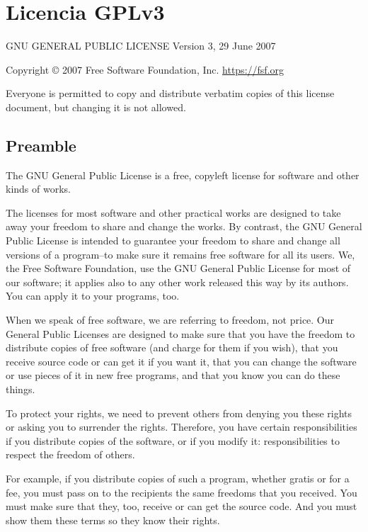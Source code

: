 \chapter{Licencia GPLv3}
\label{apn:gnu-gpl-lic}

\begin{center}
GNU GENERAL PUBLIC LICENSE
Version 3, 29 June 2007

Copyright © 2007 Free Software Foundation, Inc. \url{https://fsf.org}

Everyone is permitted to copy and distribute verbatim copies of this license document, but changing it is not allowed.
\end{center}


\section*{Preamble}

The GNU General Public License is a free, copyleft license for software and other kinds of works.

The licenses for most software and other practical works are designed to take away your freedom to share and change the works. By contrast, the GNU General Public License is intended to guarantee your freedom to share and change all versions of a program--to make sure it remains free software for all its users. We, the Free Software Foundation, use the GNU General Public License for most of our software; it applies also to any other work released this way by its authors. You can apply it to your programs, too.

When we speak of free software, we are referring to freedom, not price. Our General Public Licenses are designed to make sure that you have the freedom to distribute copies of free software (and charge for them if you wish), that you receive source code or can get it if you want it, that you can change the software or use pieces of it in new free programs, and that you know you can do these things.

To protect your rights, we need to prevent others from denying you these rights or asking you to surrender the rights. Therefore, you have certain responsibilities if you distribute copies of the software, or if you modify it: responsibilities to respect the freedom of others.

For example, if you distribute copies of such a program, whether gratis or for a fee, you must pass on to the recipients the same freedoms that you received. You must make sure that they, too, receive or can get the source code. And you must show them these terms so they know their rights.

